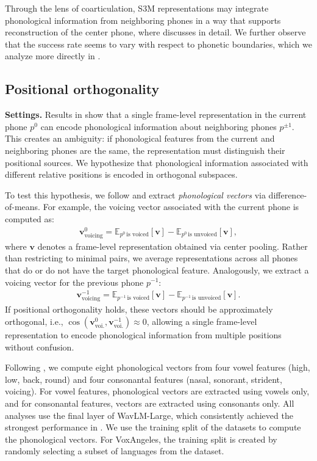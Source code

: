 \documentclass[cameraready]{Interspeech}
\begin{document}
Through the lens of coarticulation, S3M representations may integrate phonological information from neighboring phones in a way that supports reconstruction of the center phone, where  discusses in detail.
We further observe that the success rate seems to vary with respect to phonetic boundaries, which we analyze more directly in .




\subsection{Positional orthogonality} \label{ss:orthogonality}
\textbf{Settings.}
Results in  show that a single frame-level representation in the current phone $p^0$ can encode phonological information about neighboring phones $p^{\pm1}$.
This creates an ambiguity: if phonological features from the current and neighboring phones are the same, the representation must distinguish their positional sources.
We hypothesize that phonological information associated with different relative positions is encoded in orthogonal subspaces.


To test this hypothesis, we follow \cite{choi2026self} and extract \emph{phonological vectors} via difference-of-means.
For example, the voicing vector associated with the current phone is computed as:
\begin{align}
    \mathbf{v}^{0}_{\text{voicing}} 
    = \mathbb{E}_{p^{0}\,\text{is voiced}}[\mathbf{v}]
    - \mathbb{E}_{p^{0}\,\text{is unvoiced}}[\mathbf{v}],
\end{align}
where $\mathbf{v}$ denotes a frame-level representation obtained via center pooling.
Rather than restricting to minimal pairs, we average representations across all phones that do or do not have the target phonological feature.
Analogously, we extract a voicing vector for the previous phone $p^{-1}$:
\begin{align}
    \mathbf{v}^{-1}_{\text{voicing}} 
    = \mathbb{E}_{p^{-1}\,\text{is voiced}}[\mathbf{v}]
    - \mathbb{E}_{p^{-1}\,\text{is unvoiced}}[\mathbf{v}].
\end{align}
If positional orthogonality holds, these vectors should be approximately orthogonal, i.e.,
$\cos(\mathbf{v}^{0}_{\text{voi.}}, \mathbf{v}^{-1}_{\text{voi.}}) \approx 0$,
allowing a single frame-level representation to encode phonological information from multiple positions without confusion.


Following \cite{choi2026self}, we compute eight phonological vectors from four vowel features (high, low, back, round) and four consonantal features (nasal, sonorant, strident, voicing).
For vowel features, phonological vectors are extracted using vowels only, and for consonantal features, vectors are extracted using consonants only.
All analyses use the final layer of WavLM-Large, which consistently achieved the strongest performance in .
We use the training split of the datasets to compute the phonological vectors.
For VoxAngeles, the training split is created by randomly selecting a subset of languages from the dataset.
\end{document}
